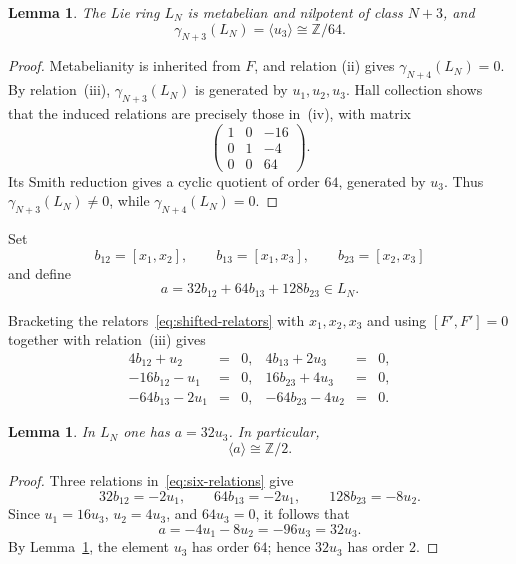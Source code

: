 \documentclass[a4paper,11pt,reqno]{amsart}
\newtheorem{lemma}[theorem]{Lemma}
\theoremstyle{definition}
\newcommand{\Z}{\mathbb Z}
\begin{document}
\begin{lemma}\label{lem:top-layer}
The Lie ring $L_N$ is metabelian and nilpotent of class $N+3$, and
\[
             \gamma_{N+3}(L_N)=\langle u_3\rangle\cong\Z/64.
\]
\end{lemma}

\begin{proof}
Metabelianity is inherited from $F$, and relation (ii) gives
$\gamma_{N+4}(L_N)=0$.  By relation~\textup{(iii)},
$\gamma_{N+3}(L_N)$ is generated by $u_1,u_2,u_3$.  Hall collection shows
that the induced relations are precisely those in~\textup{(iv)}, with
matrix
\[
 \begin{pmatrix}
  1&0&-16\\
  0&1&-4\\
  0&0&64
 \end{pmatrix}.
\]
Its Smith reduction gives a cyclic quotient of order $64$, generated by
$u_3$.  Thus $\gamma_{N+3}(L_N)\neq0$, while
$\gamma_{N+4}(L_N)=0$.
\end{proof}

Set
\[
 b_{12}=[x_1,x_2],
 \qquad
 b_{13}=[x_1,x_3],
 \qquad
 b_{23}=[x_2,x_3]
\]
and define
\begin{equation}\label{eq:a-definition}
                 a=32b_{12}+64b_{13}+128b_{23}\in L_N.
\end{equation}

Bracketing the relators~\eqref{eq:shifted-relators} with $x_1,x_2,x_3$ and
using $[F',F']=0$ together with relation~\textup{(iii)} gives
\begin{equation}\label{eq:six-relations}
 \begin{array}{rclrcl}
 4b_{12}+u_2&=&0,& 4b_{13}+2u_3&=&0,\\
 -16b_{12}-u_1&=&0,&16b_{23}+4u_3&=&0,\\
 -64b_{13}-2u_1&=&0,&-64b_{23}-4u_2&=&0.
 \end{array}
\end{equation}

\begin{lemma}\label{lem:a-order}
In $L_N$ one has $a=32u_3$.  In particular,
\[
                         \langle a\rangle\cong\Z/2.
\]
\end{lemma}

\begin{proof}
Three relations in~\eqref{eq:six-relations} give
\[
 32b_{12}=-2u_1,
 \qquad
 64b_{13}=-2u_1,
 \qquad
 128b_{23}=-8u_2.
\]
Since $u_1=16u_3$, $u_2=4u_3$, and $64u_3=0$, it follows that
\[
 a=-4u_1-8u_2=-96u_3=32u_3.
\]
By Lemma~\ref{lem:top-layer}, the element $u_3$ has order $64$; hence
$32u_3$ has order $2$.
\end{proof}
\end{document}
